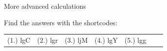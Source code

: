 \begin{exercises}{  More advanced calculations }
\begin{enumerate}[noitemsep, label=\textbf{\arabic*}. ]
\end{enumerate}
\practiceinfo
\par {} Find the answers with the shortcodes:
 \par \begin{tabular}[h]{cccccc}
 (1.) lgC  &  (2.) lgr  &  (3.) ljM  &  (4.) lgY  &  (5.) lgg  &    &   & \end{tabular}
\end{exercises}
